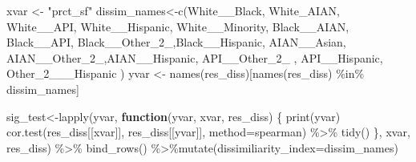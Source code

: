 \documentclass[
]{article}
\newenvironment{Shaded}{\begin{snugshade}}{\end{snugshade}}
\newcommand{\AttributeTok}[1]{\textcolor[rgb]{0.77,0.63,0.00}{#1}}
\newcommand{\ControlFlowTok}[1]{\textcolor[rgb]{0.13,0.29,0.53}{\textbf{#1}}}
\newcommand{\FunctionTok}[1]{\textcolor[rgb]{0.00,0.00,0.00}{#1}}
\newcommand{\NormalTok}[1]{#1}
\newcommand{\OtherTok}[1]{\textcolor[rgb]{0.56,0.35,0.01}{#1}}
\newcommand{\SpecialCharTok}[1]{\textcolor[rgb]{0.00,0.00,0.00}{#1}}
\newcommand{\StringTok}[1]{\textcolor[rgb]{0.31,0.60,0.02}{#1}}
\begin{document}
\begin{Shaded}
\begin{Highlighting}[]
\NormalTok{xvar }\OtherTok{\textless{}{-}} \StringTok{"prct\_sf"}
\NormalTok{dissim\_names}\OtherTok{\textless{}{-}}\FunctionTok{c}\NormalTok{(}\StringTok{\textquotesingle{}White\_\_Black\textquotesingle{}}\NormalTok{, }\StringTok{\textquotesingle{}White\_AIAN\textquotesingle{}}\NormalTok{, }\StringTok{\textquotesingle{}White\_\_API\textquotesingle{}}\NormalTok{,  }\StringTok{\textquotesingle{}White\_\_Hispanic\textquotesingle{}}\NormalTok{, }\StringTok{\textquotesingle{}White\_\_Minority\textquotesingle{}}\NormalTok{,  }\StringTok{\textquotesingle{}Black\_\_AIAN\textquotesingle{}}\NormalTok{,  }\StringTok{\textquotesingle{}Black\_\_API\textquotesingle{}}\NormalTok{,   }\StringTok{\textquotesingle{}Black\_\_Other\_2\_\textquotesingle{}}\NormalTok{,}\StringTok{\textquotesingle{}Black\_\_Hispanic\textquotesingle{}}\NormalTok{,    }\StringTok{\textquotesingle{}AIAN\_\_Asian\textquotesingle{}}\NormalTok{,  }\StringTok{\textquotesingle{}AIAN\_\_Other\_2\_\textquotesingle{}}\NormalTok{,}\StringTok{\textquotesingle{}AIAN\_\_Hispanic\textquotesingle{}}\NormalTok{,  }\StringTok{\textquotesingle{}API\_\_Other\_2\_\textquotesingle{}}\NormalTok{ ,   }\StringTok{\textquotesingle{}API\_\_Hispanic\textquotesingle{}}\NormalTok{,    }\StringTok{\textquotesingle{}Other\_2\_\_\_Hispanic\textquotesingle{}}
\NormalTok{)}
\NormalTok{yvar }\OtherTok{\textless{}{-}} \FunctionTok{names}\NormalTok{(res\_diss)[}\FunctionTok{names}\NormalTok{(res\_diss) }\SpecialCharTok{\%in\%}\NormalTok{ dissim\_names]}

\NormalTok{sig\_test}\OtherTok{\textless{}{-}}\FunctionTok{lapply}\NormalTok{(yvar,}
       \ControlFlowTok{function}\NormalTok{(yvar, xvar, res\_diss)}
\NormalTok{       \{}
         \FunctionTok{print}\NormalTok{(yvar)}
         \FunctionTok{cor.test}\NormalTok{(res\_diss[[xvar]], res\_diss[[yvar]], }\AttributeTok{method=}\StringTok{\textquotesingle{}spearman\textquotesingle{}}\NormalTok{) }\SpecialCharTok{\%\textgreater{}\%}
           \FunctionTok{tidy}\NormalTok{()}
\NormalTok{       \},}
\NormalTok{       xvar,}
\NormalTok{       res\_diss) }\SpecialCharTok{\%\textgreater{}\%}
  \FunctionTok{bind\_rows}\NormalTok{() }\SpecialCharTok{\%\textgreater{}\%}\FunctionTok{mutate}\NormalTok{(}\StringTok{\textquotesingle{}dissimiliarity\_index\textquotesingle{}}\OtherTok{=}\NormalTok{dissim\_names)}
\end{Highlighting}
\end{Shaded}
\end{document}
